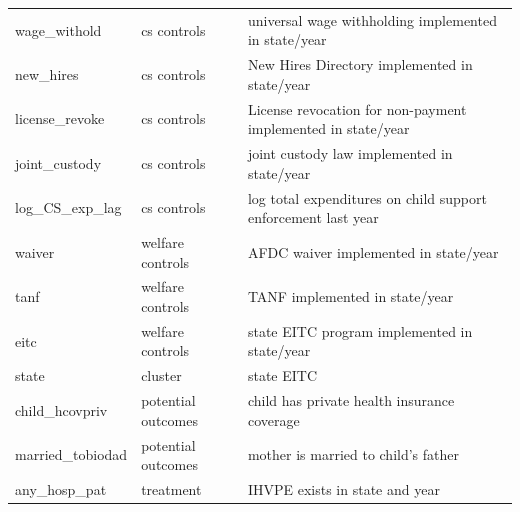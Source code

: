 \documentclass[11pt,a4paper]{article}
\begin{document}
\begin{longtable}{l|l|p{6cm}}
wage\_withold & cs controls & universal wage withholding implemented in state/year \\
new\_hires & cs controls & New Hires Directory implemented in state/year \\
license\_revoke & cs controls & License revocation for non-payment implemented in state/year \\
joint\_custody & cs controls & joint custody law implemented in state/year \\
log\_CS\_exp\_lag & cs controls & log total expenditures on child support enforcement last year \\
\hline



waiver & welfare controls & AFDC waiver implemented in state/year \\
tanf & welfare controls & TANF implemented in state/year \\
eitc & welfare controls & state EITC program implemented in state/year \\
\hline


state & cluster & state EITC  \\
\hline


child\_hcovpriv & potential outcomes & child has private health insurance coverage \\
married\_tobiodad & potential outcomes & mother is married to child's father \\
\hline




any\_hosp\_pat & treatment & IHVPE exists in state and year
\label{tab_var}
\end{longtable}
\end{document}
